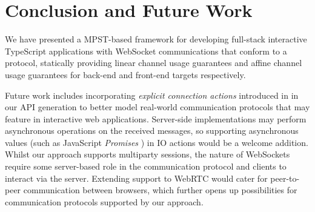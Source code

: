 \section{Conclusion and Future Work}
We have presented a MPST-based framework for developing full-stack interactive
TypeScript applications with WebSocket communications that conform to a
protocol, statically providing linear channel usage guarantees and affine
channel usage guarantees for back-end and front-end targets respectively.

Future work includes incorporating \textit{explicit connection actions}
introduced in \cite{ExplicitConnections} in our API generation to better model
real-world communication protocols that may feature in interactive web
applications.
Server-side implementations may perform asynchronous operations on the
received messages, so supporting asynchronous values (such as JavaScript
\textit{Promises} \cite{promise}) in IO actions would be a welcome addition.
Whilst our approach supports multiparty sessions, the nature of
WebSockets require some server-based role in the communication protocol and
clients to interact via the server.
Extending support to WebRTC \cite{WebRTC} would
cater for peer-to-peer communication between browsers, which further opens up
possibilities for communication protocols supported by our approach.


